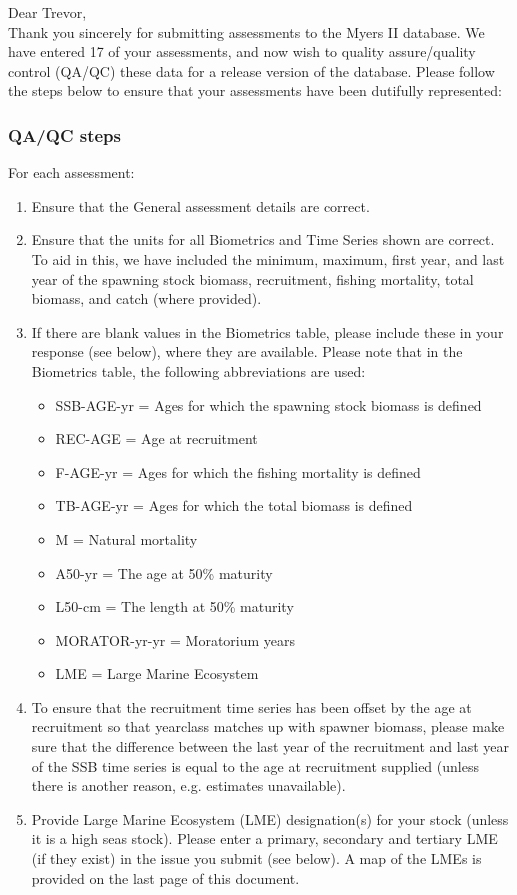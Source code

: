 \documentclass [a4paper, 10pt] {article}
\begin{document}
\noindent Dear Trevor,\\

\noindent Thank you sincerely for submitting assessments to the Myers II database. We have entered 17 of your assessments, and now wish to quality assure/quality control (QA/QC) these data for a release version of the database. Please follow the steps below to ensure that your assessments have been dutifully represented:
\subsubsection{QA/QC steps}
For each assessment:
\begin{enumerate}
\item Ensure that the General assessment details are correct.
\item Ensure that the units for all Biometrics and Time Series shown are correct. To aid in this, we have included the minimum, maximum, first year, and last year of the spawning stock biomass, recruitment, fishing mortality, total biomass, and  catch  (where provided). 
\item If there are blank values in the Biometrics table, please include these in your response (see below), where they are available.
Please note that in the Biometrics table, the following abbreviations are used:
\begin{itemize}
\item SSB-AGE-yr  = Ages for which the spawning stock biomass is defined
\item REC-AGE     = Age at recruitment
\item F-AGE-yr    = Ages for which the fishing mortality is defined 
\item TB-AGE-yr   = Ages for which the total biomass is defined
\item M      = Natural mortality
\item A50-yr      = The age at 50\% maturity
\item L50-cm      = The length at 50\% maturity
\item MORATOR-yr-yr = Moratorium years
\item LME = Large Marine Ecosystem\\
\end{itemize}
\item To ensure that the recruitment time series has been offset by the age at recruitment so that yearclass matches up with spawner biomass, please make sure that the difference between the last year of the recruitment and last year of the SSB time series is equal to the age at recruitment supplied (unless there is another reason, e.g. estimates unavailable). 
\item Provide Large Marine Ecosystem (LME) designation(s) for your stock (unless it is a high seas stock). Please enter a primary, secondary and tertiary LME (if they exist) in the issue you submit (see below). A map of the LMEs is provided on the last page of this document. 
\end{enumerate}
\vspace{-.25in}
\end{document}
